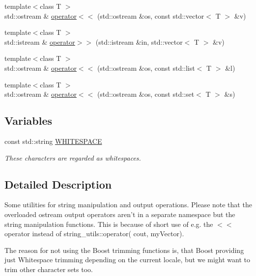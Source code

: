 \begin{DoxyCompactItemize}
\item 
{\footnotesize template$<$class T $>$ }\\std\-::ostream \& \hyperlink{namespacestring__utils_a2bb23cf681e96a435cf42db0f0faa727}{operator$<$$<$} (std\-::ostream \&os, const std\-::vector$<$ \-T $>$ \&v)
\item 
{\footnotesize template$<$class T $>$ }\\std\-::istream \& \hyperlink{namespacestring__utils_a54c6f86a6eb63870ef09e19e7da103f3}{operator$>$$>$} (std\-::istream \&in, std\-::vector$<$ \-T $>$ \&v)
\item 
{\footnotesize template$<$class T $>$ }\\std\-::ostream \& \hyperlink{namespacestring__utils_a8fc49064166e7829fe1c2ff5d4921e5f}{operator$<$$<$} (std\-::ostream \&os, const std\-::list$<$ \-T $>$ \&l)
\item 
{\footnotesize template$<$class T $>$ }\\std\-::ostream \& \hyperlink{namespacestring__utils_a290aeee844eb37e1c76a23243d5d8ee2}{operator$<$$<$} (std\-::ostream \&os, const std\-::set$<$ \-T $>$ \&s)
\end{DoxyCompactItemize}
\subsection*{\-Variables}
\begin{DoxyCompactItemize}
\item 
const std\-::string \hyperlink{namespacestring__utils_a716c3d0cc1ab19bd56d1b2aa2a50662f}{\-W\-H\-I\-T\-E\-S\-P\-A\-C\-E}
\begin{DoxyCompactList}\small\item\em \-These characters are regarded as whitespaces. \end{DoxyCompactList}\end{DoxyCompactItemize}


\subsection{\-Detailed \-Description}
\-Some utilities for string manipulation and output operations. \-Please note that the overloaded ostream output operators aren't in a separate namespace but the string manipulation functions. \-This is because of short use of e.\-g. the {\ttfamily $<$$<$} operator instead of {\ttfamily string\-\_\-utils\-::operator( cout, my\-Vector)}.

\-The reason for not using the \-Boost trimming functions is, that \-Boost providing just \-Whitespace trimming depending on the current locale, but we might want to trim other character sets too.

